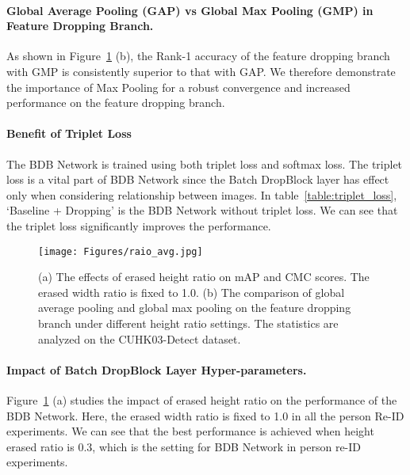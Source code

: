 \documentclass[10pt,twocolumn,letterpaper]{article}
\begin{document}
\paragraph{Global Average Pooling (GAP) vs Global Max Pooling (GMP) in Feature Dropping Branch.}\vspace{-4mm}
As shown in Figure~\ref{fig:cuhk_ratio} (b), the Rank-1 accuracy of the feature dropping branch with GMP is consistently superior to that with GAP.
We therefore demonstrate the importance of Max Pooling \textcolor{myRed}{for} a robust convergence and increased performance on the feature dropping branch.

\paragraph{Benefit of Triplet Loss}\vspace{-4mm}
The BDB Network is trained using both triplet loss and softmax loss. The triplet loss is a vital part of BDB Network since the Batch DropBlock layer has effect only when considering relationship between images. In table~\ref{table:triplet_loss}, `Baseline + Dropping' is the BDB Network without triplet loss. We can see that the triplet loss significantly improves the performance.

\begin{figure}
\texttt{[image: Figures/raio\_avg.jpg]}
\vspace{-6mm}
\caption{(a) The effects of erased height ratio on mAP and CMC scores. The erased width ratio is fixed to 1.0. (b) The comparison of  global average pooling and global max pooling on the feature dropping branch under different height ratio settings. The statistics are analyzed on the CUHK03-Detect dataset.}
\label{fig:cuhk_ratio}
\vspace{2mm}
\end{figure}

\paragraph{Impact of Batch DropBlock Layer Hyper-parameters.}\vspace{-4mm}
Figure~\ref{fig:cuhk_ratio} (a) studies the impact of erased height ratio on the performance of the BDB Network.  
Here, the erased width ratio is fixed to 1.0 in all the person Re-ID experiments.
We can see that the best performance is achieved when height erased ratio is 0.3, which is the setting for BDB Network in person re-ID experiments.
\end{document}
